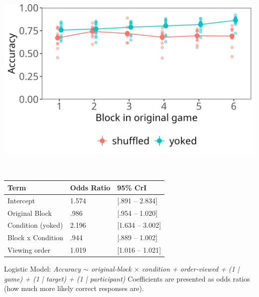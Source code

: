 \documentclass[11pt,a4paper]{article}
\begin{document}
\bigskip

\begin{minipage}{.45\textwidth}
	{	\includegraphics[width=\textwidth]{hsp1.png}} 
	\begin{small}
%
		
	\end{small}
	
\end{minipage}
~~
\begin{minipage}{.5\textwidth}
	\begin{small}

	\begin{tabular}{|l|l|l|}
		\hline
		Term & Odds Ratio & 95\% CrI \\
		\hline
		Intercept & 1.574 & [.891 -- 2.834] \\
		Original Block & .986 & [.954 -- 1.020] \\ 
		Condition (yoked) & 2.196 & [1.634 -- 3.002] \\
		Block x Condition & .944 & [.889 -- 1.002] \\
		Viewing order & 1.019 & [1.016 -- 1.021] \\
		\hline
	\end{tabular}
	\vspace{2pt}
	
	 Logistic Model: \textit{Accuracy $\sim$  original-block $\times$ condition + order-viewed + (1 | game) + (1 | target) + (1 | participant)  } Coefficients are presented as odds ratios (how much more likely correct responses are).
	 
	 \end{small}
	 	
\end{minipage}
\end{document}
